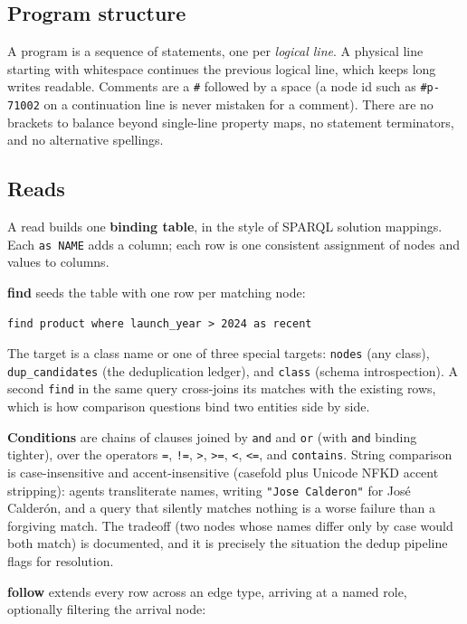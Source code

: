 \documentclass[11pt]{article}
\begin{document}
\subsection{Program structure}

A program is a sequence of statements, one per \emph{logical line}. A physical line starting with whitespace continues the previous logical line, which keeps long writes readable. Comments are a \texttt{\#} followed by a space (a node id such as \texttt{\#p-71002} on a continuation line is never mistaken for a comment). There are no brackets to balance beyond single-line property maps, no statement terminators, and no alternative spellings.

\subsection{Reads}

A read builds one \textbf{binding table}, in the style of SPARQL solution mappings. Each \texttt{as NAME} adds a column; each row is one consistent assignment of nodes and values to columns.

\textbf{find} seeds the table with one row per matching node:

\begin{lstlisting}[style=gl]
find product where launch_year > 2024 as recent
\end{lstlisting}

The target is a class name or one of three special targets: \texttt{nodes} (any class), \texttt{dup\_candidates} (the deduplication ledger), and \texttt{class} (schema introspection). A second \texttt{find} in the same query cross-joins its matches with the existing rows, which is how comparison questions bind two entities side by side.

\textbf{Conditions} are chains of clauses joined by \texttt{and} and \texttt{or} (with \texttt{and} binding tighter), over the operators \texttt{=}, \texttt{!=}, \texttt{>}, \texttt{>=}, \texttt{<}, \texttt{<=}, and \texttt{contains}. String comparison is case-insensitive and accent-insensitive (casefold plus Unicode NFKD accent stripping): agents transliterate names, writing \texttt{"Jose Calderon"} for José Calderón, and a query that silently matches nothing is a worse failure than a forgiving match. The tradeoff (two nodes whose names differ only by case would both match) is documented, and it is precisely the situation the dedup pipeline flags for resolution.

\textbf{follow} extends every row across an edge type, arriving at a named role, optionally filtering the arrival node:
\end{document}
